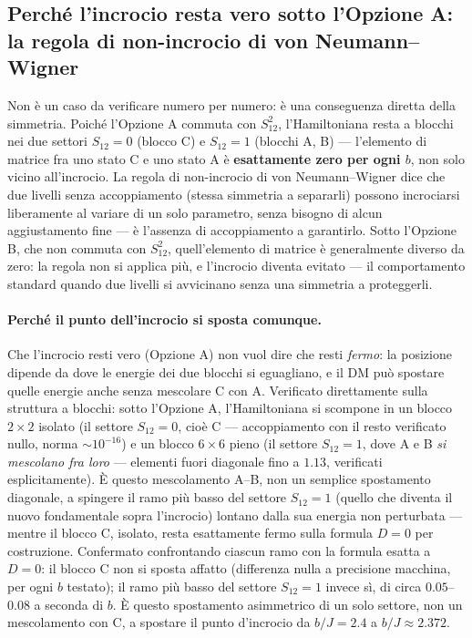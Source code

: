 \documentclass[11pt,a4paper]{article}
\begin{document}

\subsection*{Perché l'incrocio resta vero sotto l'Opzione A: la regola di
non-incrocio di von Neumann--Wigner}

Non è un caso da verificare numero per numero: è una conseguenza diretta
della simmetria. Poiché l'Opzione A commuta con $S_{12}^2$, l'Hamiltoniana
resta a blocchi nei due settori $S_{12}=0$ (blocco C) e $S_{12}=1$
(blocchi A, B) --- l'elemento di matrice fra uno stato C e uno stato A è
\textbf{esattamente zero per ogni $b$}, non solo vicino all'incrocio. La
regola di non-incrocio di von Neumann--Wigner dice che due livelli senza
accoppiamento (stessa simmetria a separarli) possono incrociarsi
liberamente al variare di un solo parametro, senza bisogno di alcun
aggiustamento fine --- è l'assenza di accoppiamento a garantirlo. Sotto
l'Opzione B, che non commuta con $S_{12}^2$, quell'elemento di matrice è
generalmente diverso da zero: la regola non si applica più, e l'incrocio
diventa evitato --- il comportamento standard quando due livelli si
avvicinano senza una simmetria a proteggerli.

\paragraph{Perché il punto dell'incrocio si sposta comunque.} Che
l'incrocio resti vero (Opzione A) non vuol dire che resti \emph{fermo}: la
posizione dipende da dove le energie dei due blocchi si eguagliano, e il
DM può spostare quelle energie anche senza mescolare C con A. Verificato
direttamente sulla struttura a blocchi: sotto l'Opzione A, l'Hamiltoniana
si scompone in un blocco $2\times2$ isolato (il settore $S_{12}=0$, cioè
C --- accoppiamento con il resto verificato nullo, norma $\sim10^{-16}$) e
un blocco $6\times6$ pieno (il settore $S_{12}=1$, dove A e B \emph{si
mescolano fra loro} --- elementi fuori diagonale fino a $1.13$, verificati
esplicitamente). È questo mescolamento A--B, non un semplice spostamento
diagonale, a spingere il ramo più basso del settore $S_{12}=1$ (quello che
diventa il nuovo fondamentale sopra l'incrocio) lontano dalla sua energia
non perturbata --- mentre il blocco C, isolato, resta esattamente fermo
sulla formula $D=0$ per costruzione. Confermato confrontando ciascun ramo
con la formula esatta a $D=0$: il blocco C non si sposta affatto
(differenza nulla a precisione macchina, per ogni $b$ testato); il ramo
più basso del settore $S_{12}=1$ invece sì, di circa $0.05$--$0.08$ a
seconda di $b$. È questo spostamento asimmetrico di un solo settore, non
un mescolamento con C, a spostare il punto d'incrocio da $b/J=2.4$ a
$b/J\approx2.372$.
\end{document}
